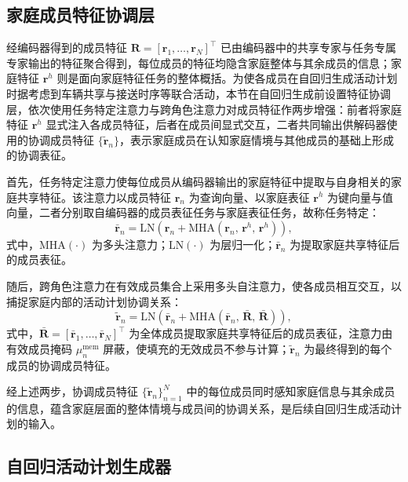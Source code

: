\subsection{家庭成员特征协调层}\label{subsec.cohact.coord}

经编码器得到的成员特征 $\mathbf{R}=[\mathbf{r}_1,\dots,\mathbf{r}_N]^{\top}$ 已由编码器中的共享专家与任务专属专家输出的特征聚合得到，每位成员的特征均隐含家庭整体与其余成员的信息；家庭特征 $\mathbf{r}^h$ 则是面向家庭特征任务的整体概括。为使各成员在自回归生成活动计划时据考虑到车辆共享与接送时序等联合活动，本节在自回归生成前设置特征协调层，依次使用任务特定注意力与跨角色注意力对成员特征作两步增强：前者将家庭特征 $\mathbf{r}^h$ 显式注入各成员特征，后者在成员间显式交互，二者共同输出供解码器使用的协调成员特征 $\{\tilde{\mathbf{r}}_n\}$，表示家庭成员在认知家庭情境与其他成员的基础上形成的协调表征。

首先，任务特定注意力使每位成员从编码器输出的家庭特征中提取与自身相关的家庭共享特征。该注意力以成员特征 $\mathbf{r}_n$ 为查询向量、以家庭表征 $\mathbf{r}^h$ 为键向量与值向量，二者分别取自编码器的成员表征任务与家庭表征任务，故称任务特定：
\begin{equation}
\bar{\mathbf{r}}_n=\mathrm{LN}\!\left(\mathbf{r}_n+\mathrm{MHA}\!\left(\mathbf{r}_n,\,\mathbf{r}^h,\,\mathbf{r}^h\right)\right),
\label{eq.cohact.famattn}
\end{equation}
式中，$\mathrm{MHA}(\cdot)$ 为多头注意力；$\mathrm{LN}(\cdot)$ 为层归一化；$\bar{\mathbf{r}}_n$ 为提取家庭共享特征后的成员表征。

随后，跨角色注意力在有效成员集合上采用多头自注意力，使各成员相互交互，以捕捉家庭内部的活动计划协调关系：
\begin{equation}
\tilde{\mathbf{r}}_n=\mathrm{LN}\!\left(\bar{\mathbf{r}}_n+\mathrm{MHA}\!\left(\bar{\mathbf{r}}_n,\,\bar{\mathbf{R}},\,\bar{\mathbf{R}}\right)\right),
\label{eq.cohact.roleattn}
\end{equation}
式中，$\bar{\mathbf{R}}=[\bar{\mathbf{r}}_1,\dots,\bar{\mathbf{r}}_N]^{\top}$ 为全体成员提取家庭共享特征后的成员表征，注意力由有效成员掩码 $\mu_n^{\text{mem}}$ 屏蔽，使填充的无效成员不参与计算；$\tilde{\mathbf{r}}_n$ 为最终得到的每个成员的协调成员特征。

经上述两步，协调成员特征 $\{\tilde{\mathbf{r}}_n\}_{n=1}^{N}$ 中的每位成员同时感知家庭信息与其余成员的信息，蕴含家庭层面的整体情境与成员间的协调关系，是后续自回归生成活动计划的输入。

\subsection{自回归活动计划生成器}\label{subsec.cohact.autoreg}

